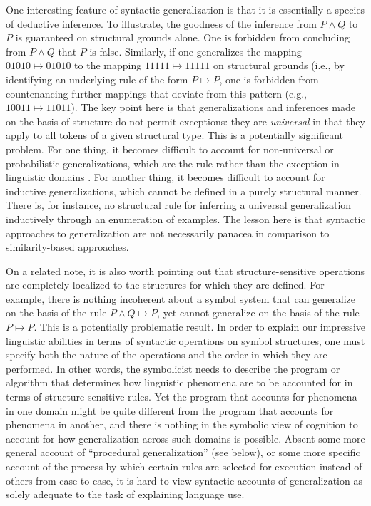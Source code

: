 One interesting feature of syntactic generalization is that it is essentially a species of deductive inference. To illustrate, the goodness of the inference from $P \land Q$ to $P$ is guaranteed on structural grounds alone. One is forbidden from concluding from $P \land Q$ that $P$ is false. Similarly, if one generalizes the mapping $01010 \mapsto 01010$ to the mapping $11111 \mapsto 11111$ on structural grounds (i.e., by identifying an underlying rule of the form $P \mapsto P$, one is forbidden from countenancing further mappings that deviate from this pattern (e.g., $10011 \mapsto 11011$). The key point here is that generalizations and inferences made on the basis of structure do not permit exceptions: they are \textit{universal} in that they apply to all tokens of a given structural type. This is a potentially significant problem. For one thing, it becomes difficult to account for non-universal or probabilistic generalizations, which are the rule rather than the exception in linguistic domains \citep{SmolenskyLegendre:2006,ChaterManning:2006,Manning:2015,Seidenberg:1997}. For another thing, it becomes difficult to account for inductive generalizations, which cannot be defined in a purely structural manner. There is, for instance, no structural rule for inferring a universal generalization inductively through an enumeration of examples. The lesson here is that syntactic approaches to generalization are not necessarily panacea in comparison to similarity-based approaches. 

On a related note, it is also worth pointing out that structure-sensitive operations are completely localized to the structures for which they are defined. For example, there is nothing incoherent about a symbol system that can generalize on the basis of the rule $P \land Q \mapsto P$, yet cannot generalize on the basis of the rule $P \mapsto P$. This is a potentially problematic result. In order to explain our impressive linguistic abilities in terms of syntactic operations on symbol structures, one must specify both the nature of the operations and the order in which they are performed. In other words, the symbolicist needs to describe the program or algorithm that determines how linguistic phenomena are to be accounted for in terms of structure-sensitive rules. Yet the program that accounts for phenomena in one domain might be quite different from the program that accounts for phenomena in another, and there is nothing in the symbolic view of cognition to account for how generalization across such domains is possible. Absent some more general account of ``procedural generalization'' (see below), or some more specific account of the process by which certain rules are selected for execution instead of others from case to case, it is hard to view syntactic accounts of generalization as solely adequate to the task of explaining language use. 

